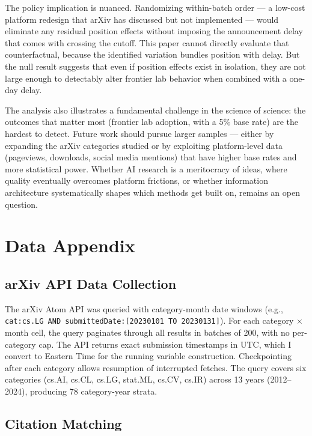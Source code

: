\documentclass[12pt]{article}
\begin{document}
The policy implication is nuanced. Randomizing within-batch order --- a low-cost platform redesign that arXiv has discussed but not implemented --- would eliminate any residual position effects without imposing the announcement delay that comes with crossing the cutoff. This paper cannot directly evaluate that counterfactual, because the identified variation bundles position with delay. But the null result suggests that even if position effects exist in isolation, they are not large enough to detectably alter frontier lab behavior when combined with a one-day delay.

The analysis also illustrates a fundamental challenge in the science of science: the outcomes that matter most (frontier lab adoption, with a 5\% base rate) are the hardest to detect. Future work should pursue larger samples --- either by expanding the arXiv categories studied or by exploiting platform-level data (pageviews, downloads, social media mentions) that have higher base rates and more statistical power. Whether AI research is a meritocracy of ideas, where quality eventually overcomes platform frictions, or whether information architecture systematically shapes which methods get built on, remains an open question.


\label{apep_main_text_end}




\newpage
\appendix

\section{Data Appendix}

\subsection{arXiv API Data Collection}

The arXiv Atom API was queried with category-month date windows (e.g., \texttt{cat:cs.LG AND submittedDate:[20230101 TO 20230131]}). For each category $\times$ month cell, the query paginates through all results in batches of 200, with no per-category cap. The API returns exact submission timestamps in UTC, which I convert to Eastern Time for the running variable construction. Checkpointing after each category allows resumption of interrupted fetches. The query covers six categories (cs.AI, cs.CL, cs.LG, stat.ML, cs.CV, cs.IR) across 13 years (2012--2024), producing 78 category-year strata.

\subsection{Citation Matching}
\end{document}
